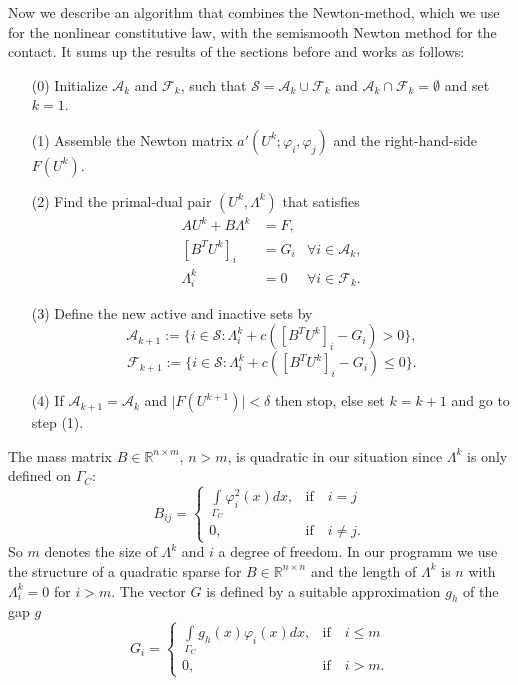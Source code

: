 \documentclass{article}
\begin{document}
Now we describe an algorithm that combines the Newton-method, which we use for
the nonlinear constitutive law, with the semismooth Newton method for the contact. It
sums up the results of the sections before and works as follows:
\begin{itemize}
 \item[(0)] Initialize $\mathcal{A}_k$ and $\mathcal{F}_k$, such that $\mathcal{S} = \mathcal{A}_k \cup \mathcal{F}_k$ and $\mathcal{A}_k \cap \mathcal{F}_k = \emptyset$ and set $k = 1$.
 \item[(1)] Assemble the Newton matrix $a'(U^k;\varphi_i,\varphi_j)$ and the right-hand-side $F(U^k)$.
 \item[(2)] Find the primal-dual pair $(U^k,\Lambda^k)$ that satisfies
 \begin{align*}
 AU^k + B\Lambda^k & = F, &\\
 \left[B^TU^k\right]_i & = G_i & \forall i\in\mathcal{A}_k,\\
 \Lambda^k_i & = 0 & \forall i\in\mathcal{F}_k.
 \end{align*}
 \item[(3)] Define the new active and inactive sets by
 $$\mathcal{A}_{k+1}:=\lbrace i\in\mathcal{S}:\Lambda^k_i +
 c\left(\left[B^TU^k\right]_i - G_i\right) > 0\rbrace,$$
 $$\mathcal{F}_{k+1}:=\lbrace i\in\mathcal{S}:\Lambda^k_i +
 c\left(\left[B^TU^k\right]_i - G_i\right) \leq 0\rbrace.$$
 \item[(4)] If $\mathcal{A}_{k+1} = \mathcal{A}_k$ and $\vert
 F\left(U^{k+1}\right) \vert < \delta$ then stop, else set $k=k+1$ and go to
 step (1).
\end{itemize}
\noindent
The mass matrix $B\in\mathbb{R}^{n\times m}$, $n>m$, is quadratic in our
situation since $\Lambda^k$ is only defined on $\Gamma_C$:
$$B_{ij} = \begin{cases}
\int\limits_{\Gamma_C}\varphi_i^2(x)dx, & \text{if}\quad i=j\\
0, & \text{if}\quad i\neq j.
\end{cases}$$
So $m$ denotes the size of $\Lambda^k$ and $i$ a degree of freedom. In our
programm we use the structure of a quadratic sparse for $B\in\mathbb{R}^{n\times
n}$ and the length of $\Lambda^k$ is $n$ with $\Lambda^k_i = 0$ for $i>m$.
The vector $G$ is defined by a suitable approximation $g_h$ of the gap $g$
$$G_i = \begin{cases}
\int\limits_{\Gamma_C}g_h(x)\varphi_i(x)dx, & \text{if}\quad i\leq m\\
0, & \text{if}\quad i>m.
\end{cases}$$\\
\end{document}
